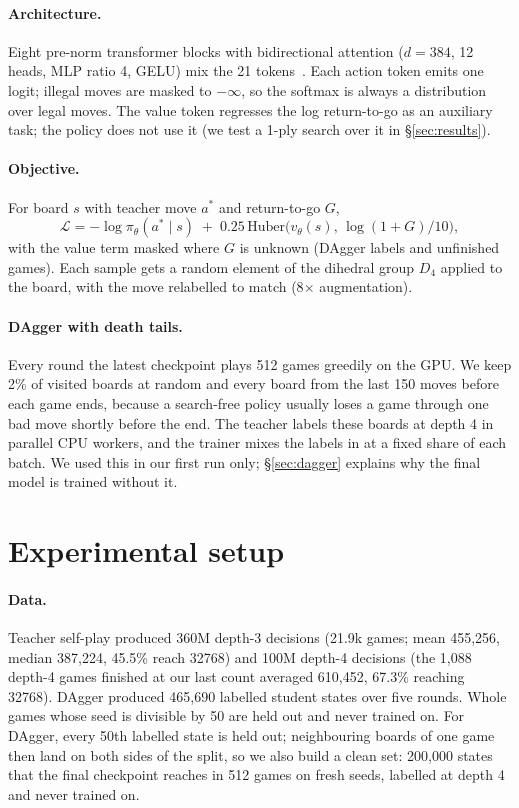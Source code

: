 \documentclass{article}
\begin{document}
\paragraph{Architecture.}
Eight pre-norm transformer blocks with bidirectional attention ($d=384$, 12 heads, MLP ratio 4, GELU) mix the 21 tokens~\citep{vaswani2017attention}.
Each action token emits one logit; illegal moves are masked to $-\infty$, so the softmax is always a distribution over legal moves.
The value token regresses the log return-to-go as an auxiliary task; the policy does not use it (we test a 1-ply search over it in \S\ref{sec:results}).

\paragraph{Objective.}
For board $s$ with teacher move $a^\ast$ and return-to-go $G$,
\begin{equation}
\mathcal{L} = -\log \pi_\theta(a^\ast\mid s) \;+\; 0.25\,\mathrm{Huber}\big(v_\theta(s),\, \log(1+G)/10\big),
\end{equation}
with the value term masked where $G$ is unknown (DAgger labels and unfinished games).
Each sample gets a random element of the dihedral group $D_4$ applied to the board, with the move relabelled to match (8$\times$ augmentation).

\paragraph{DAgger with death tails.}
Every round the latest checkpoint plays 512 games greedily on the GPU.
We keep 2\% of visited boards at random and every board from the last 150 moves before each game ends, because a search-free policy usually loses a game through one bad move shortly before the end.
The teacher labels these boards at depth 4 in parallel CPU workers, and the trainer mixes the labels in at a fixed share of each batch.
We used this in our first run only; \S\ref{sec:dagger} explains why the final model is trained without it.

\section{Experimental setup}

\paragraph{Data.}
Teacher self-play produced 360M depth-3 decisions (21.9k games; mean 455{,}256, median 387{,}224, 45.5\% reach 32768) and 100M depth-4 decisions (the 1{,}088 depth-4 games finished at our last count averaged 610{,}452, 67.3\% reaching 32768).
DAgger produced 465{,}690 labelled student states over five rounds.
Whole games whose seed is divisible by 50 are held out and never trained on.
For DAgger, every 50th labelled state is held out; neighbouring boards of one game then land on both sides of the split, so we also build a clean set: 200{,}000 states that the final checkpoint reaches in 512 games on fresh seeds, labelled at depth 4 and never trained on.
\end{document}
